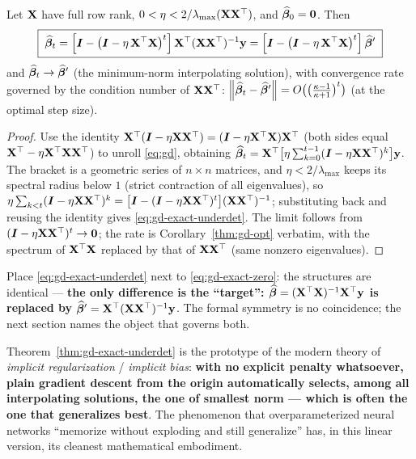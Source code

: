 \begin{theorem}\label{thm:gd-exact-underdet}
Let $\mathbf{X}$ have full row rank, $0 < \eta < 2/\lambda_{\max}(\mathbf{X}\mathbf{X}^\top)$, and $\widehat{\bm{\beta}}_0 = \mathbf{0}$. Then
\begin{equation}\label{eq:gd-exact-underdet}
  \boxed{\;\widehat{\bm{\beta}}_t = \Big[ \bm{I} - \big( \bm{I} - \eta\, \mathbf{X}^\top \mathbf{X} \big)^{t} \Big]\, \mathbf{X}^\top (\mathbf{X} \mathbf{X}^\top)^{-1} \mathbf{y}
       = \Big[ \bm{I} - \big( \bm{I} - \eta\, \mathbf{X}^\top \mathbf{X} \big)^{t} \Big]\, \widehat{\bm{\beta}}'\;}
\end{equation}
and $\widehat{\bm{\beta}}_t \to \widehat{\bm{\beta}}'$ (the minimum-norm interpolating solution), with convergence rate governed by the condition number of $\mathbf{X}\mathbf{X}^\top$: $\left\lVert \widehat{\bm{\beta}}_t - \widehat{\bm{\beta}}' \right\rVert = O\big( \big(\frac{\kappa - 1}{\kappa + 1}\big)^t \big)$ (at the optimal step size).
\end{theorem}
\begin{proof}
Use the identity $\mathbf{X}^\top (\bm{I} - \eta \mathbf{X}\mathbf{X}^\top) = (\bm{I} - \eta \mathbf{X}^\top\mathbf{X}) \mathbf{X}^\top$ (both sides equal $\mathbf{X}^\top - \eta \mathbf{X}^\top \mathbf{X} \mathbf{X}^\top$) to unroll \eqref{eq:gd}, obtaining $\widehat{\bm{\beta}}_t = \mathbf{X}^\top \big[ \eta \sum_{k=0}^{t-1} (\bm{I} - \eta\mathbf{X}\mathbf{X}^\top)^k \big] \mathbf{y}$. The bracket is a geometric series of $n \times n$ matrices, and $\eta < 2/\lambda_{\max}$ keeps its spectral radius below $1$ (strict contraction of all eigenvalues), so $\eta \sum_{k<t}(\bm{I} - \eta\mathbf{X}\mathbf{X}^\top)^k = \big[ \bm{I} - (\bm{I} - \eta\mathbf{X}\mathbf{X}^\top)^t \big](\mathbf{X}\mathbf{X}^\top)^{-1}$; substituting back and reusing the identity gives \eqref{eq:gd-exact-underdet}. The limit follows from $(\bm{I} - \eta\mathbf{X}\mathbf{X}^\top)^t \to \mathbf{0}$; the rate is Corollary~\ref{thm:gd-opt} verbatim, with the spectrum of $\mathbf{X}^\top\mathbf{X}$ replaced by that of $\mathbf{X}\mathbf{X}^\top$ (same nonzero eigenvalues).
\end{proof}

Place \eqref{eq:gd-exact-underdet} next to \eqref{eq:gd-exact-zero}: the structures are identical — \textbf{the only difference is the ``target'': $\widehat{\bm{\beta}} = (\mathbf{X}^\top\mathbf{X})^{-1}\mathbf{X}^\top\mathbf{y}$ is replaced by $\widehat{\bm{\beta}}' = \mathbf{X}^\top(\mathbf{X}\mathbf{X}^\top)^{-1}\mathbf{y}$}. The formal symmetry is no coincidence; the next section names the object that governs both.

\begin{remark}
Theorem~\ref{thm:gd-exact-underdet} is the prototype of the modern theory of \emph{implicit regularization} / \emph{implicit bias}: \textbf{with no explicit penalty whatsoever, plain gradient descent from the origin automatically selects, among all interpolating solutions, the one of smallest norm — which is often the one that generalizes best}. The phenomenon that overparameterized neural networks ``memorize without exploding and still generalize'' has, in this linear version, its cleanest mathematical embodiment.
\end{remark}

